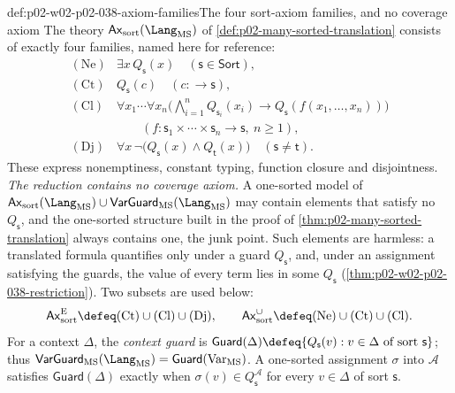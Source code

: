 \begin{hbconvention}{def:p02-w02-p02-038-axiom-families}{The four sort-axiom families, and no coverage axiom}
The theory \(\mathsf{Ax}_{\mathrm{sort}}(\Lang_{\mathrm{MS}})\) of
\cref{def:p02-many-sorted-translation} consists of exactly four families,
named here for reference:
\[
\begin{array}{ll}
 (\mathrm{Ne}) & \exists x\,Q_{\mathsf s}(x)\quad(\mathsf s\in\mathsf{Sort}),\\[2pt]
 (\mathrm{Ct}) & Q_{\mathsf s}(c)\quad(c:\longrightarrow\mathsf s),\\[2pt]
 (\mathrm{Cl}) & \forall x_1\cdots\forall x_n
   \bigl(\bigwedge_{i=1}^{n}Q_{\mathsf s_i}(x_i)\to
   Q_{\mathsf s}(f(x_1,\ldots,x_n))\bigr)\\
   & \qquad(f:\mathsf s_1\times\cdots\times\mathsf s_n\longrightarrow\mathsf s,\ n\geq1),\\[2pt]
 (\mathrm{Dj}) & \forall x\,\neg\bigl(Q_{\mathsf s}(x)\land Q_{\mathsf t}(x)\bigr)
   \quad(\mathsf s\ne\mathsf t).
\end{array}
\]
These express nonemptiness, constant typing, function closure and
disjointness.  \emph{The reduction contains no coverage axiom.}  A one-sorted
model of
\(\mathsf{Ax}_{\mathrm{sort}}(\Lang_{\mathrm{MS}})\cup
\mathsf{VarGuard}_{\mathrm{MS}}(\Lang_{\mathrm{MS}})\) may contain elements
that satisfy no \(Q_{\mathsf s}\), and the one-sorted structure built in the
proof of \cref{thm:p02-many-sorted-translation} always contains one, the junk
point.  Such elements are harmless: a translated formula quantifies only
under a guard \(Q_{\mathsf s}\), and, under an assignment satisfying the
guards, the value of every term lies in some \(Q_{\mathsf s}\)
(\cref{thm:p02-w02-p02-038-restriction}).  Two subsets are used below:
\[
 \mathsf{Ax}^{\mathrm E}_{\mathrm{sort}}\defeq
   (\mathrm{Ct})\cup(\mathrm{Cl})\cup(\mathrm{Dj}),
 \qquad
 \mathsf{Ax}^{\cup}_{\mathrm{sort}}\defeq
   (\mathrm{Ne})\cup(\mathrm{Ct})\cup(\mathrm{Cl}).
\]
For a context \(\Delta\), the \emph{context guard} is
\(\mathsf{Guard}(\Delta)\defeq\{Q_{\mathsf s}(v):v\in\Delta\text{ of sort }
\mathsf s\}\); thus
\(\mathsf{VarGuard}_{\mathrm{MS}}(\Lang_{\mathrm{MS}})=
\mathsf{Guard}(\mathrm{Var}_{\mathrm{MS}})\).  A one-sorted assignment
\(\sigma\) into \(\mathcal A\) satisfies \(\mathsf{Guard}(\Delta)\) exactly
when \(\sigma(v)\in Q_{\mathsf s}^{\mathcal A}\) for every \(v\in\Delta\) of
sort \(\mathsf s\).
\end{hbconvention}

